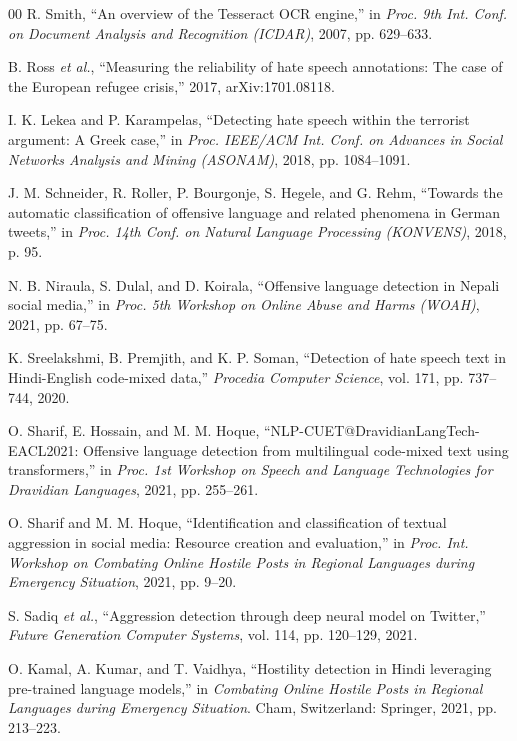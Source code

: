 \documentclass[conference]{IEEEtran}
\begin{document}
\begin{thebibliography}{00}
 R. Smith, ``An overview of the Tesseract OCR engine,'' in \textit{Proc. 9th Int. Conf. on Document Analysis and Recognition (ICDAR)}, 2007, pp. 629--633.

 B. Ross \textit{et al.}, ``Measuring the reliability of hate speech annotations: The case of the European refugee crisis,'' 2017, arXiv:1701.08118.

 I. K. Lekea and P. Karampelas, ``Detecting hate speech within the terrorist argument: A Greek case,'' in \textit{Proc. IEEE/ACM Int. Conf. on Advances in Social Networks Analysis and Mining (ASONAM)}, 2018, pp. 1084--1091.

 J. M. Schneider, R. Roller, P. Bourgonje, S. Hegele, and G. Rehm, ``Towards the automatic classification of offensive language and related phenomena in German tweets,'' in \textit{Proc. 14th Conf. on Natural Language Processing (KONVENS)}, 2018, p. 95.

 N. B. Niraula, S. Dulal, and D. Koirala, ``Offensive language detection in Nepali social media,'' in \textit{Proc. 5th Workshop on Online Abuse and Harms (WOAH)}, 2021, pp. 67--75.

 K. Sreelakshmi, B. Premjith, and K. P. Soman, ``Detection of hate speech text in Hindi-English code-mixed data,'' \textit{Procedia Computer Science}, vol. 171, pp. 737--744, 2020.

 O. Sharif, E. Hossain, and M. M. Hoque, ``NLP-CUET@DravidianLangTech-EACL2021: Offensive language detection from multilingual code-mixed text using transformers,'' in \textit{Proc. 1st Workshop on Speech and Language Technologies for Dravidian Languages}, 2021, pp. 255--261.

 O. Sharif and M. M. Hoque, ``Identification and classification of textual aggression in social media: Resource creation and evaluation,'' in \textit{Proc. Int. Workshop on Combating Online Hostile Posts in Regional Languages during Emergency Situation}, 2021, pp. 9--20.

 S. Sadiq \textit{et al.}, ``Aggression detection through deep neural model on Twitter,'' \textit{Future Generation Computer Systems}, vol. 114, pp. 120--129, 2021.

 O. Kamal, A. Kumar, and T. Vaidhya, ``Hostility detection in Hindi leveraging pre-trained language models,'' in \textit{Combating Online Hostile Posts in Regional Languages during Emergency Situation}. Cham, Switzerland: Springer, 2021, pp. 213--223.


\end{thebibliography}
\end{document}
